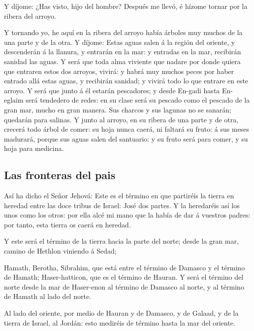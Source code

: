  Y díjome: ¿Has visto, hijo del hombre? Después me llevó,
é hízome tornar por la ribera del arroyo.

 Y tornando yo, he aquí en la ribera del arroyo había
árboles muy muchos de la una parte y de la otra.  Y
díjome: Estas aguas salen á la región del oriente, y descenderán á la
llanura, y entrarán en la mar: y entradas en la mar, recibirán sanidad
las aguas.  Y será que toda alma viviente que nadare por
donde quiera que entraren estos dos arroyos, vivirá: y habrá muy muchos
peces por haber entrado allá estas aguas, y recibirán sanidad; y vivirá
todo lo que entrare en este arroyo.  Y será que junto á
él estarán pescadores; y desde En-gadi hasta En-eglaim será tendedero de
redes: en su clase será su pescado como el pescado de la gran mar, mucho
en gran manera.  Sus charcos y sus lagunas no se sanarán;
quedarán para salinas.  Y junto al arroyo, en su ribera
de una parte y de otra, crecerá todo árbol de comer: su hoja nunca
caerá, ni faltará su fruto: á sus meses madurará, porque sus aguas salen
del santuario: y su fruto será para comer, y su hoja para medicina.

\hypertarget{las-fronteras-del-pais}{%
\subsection{Las fronteras del pais}\label{las-fronteras-del-pais}}

 Así ha dicho el Señor Jehová: Este es el término en que
partiréis la tierra en heredad entre las doce tribus de Israel: José dos
partes.  Y la heredaréis así los unos como los otros: por
ella alcé mi mano que la había de dar á vuestros padres: por tanto, esta
tierra os caerá en heredad.

 Y este será el término de la tierra hacia la parte del
norte; desde la gran mar, camino de Hethlon viniendo á Sedad;

 Hamath, Berotha, Sibrahim, que está entre el término de
Damasco y el término de Hamath; Haser-hatticon, que es el término de
Hauran.  Y será el término del norte desde la mar de
Haser-enon al término de Damasco al norte, y al término de Hamath al
lado del norte.

 Al lado del oriente, por medio de Hauran y de Damasco, y
de Galaad, y de la tierra de Israel, al Jordán: esto mediréis de término
hasta la mar del oriente.

